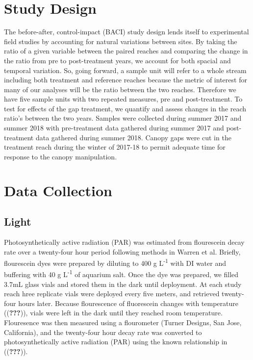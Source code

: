 \documentclass[double,12pt]{beavtex}
\begin{document}
  \section*{Study Design}\label{study-design}
  
  The before-after, control-impact (BACI) study design lends itself to
  experimental field studies by accounting for natural variations between
  sites. By taking the ratio of a given variable between the paired
  reaches and comparing the change in the ratio from pre to post-treatment
  years, we account for both spacial and temporal variation. So, going
  forward, a sample unit will refer to a whole stream including both
  treatment and reference reaches because the metric of interest for many
  of our analyses will be the ratio between the two reaches. Therefore we
  have five sample units with two repeated measures, pre and
  post-treatment. To test for effects of the gap treatment, we quantify
  and assess changes in the reach ratio's between the two years. Samples
  were collected during summer 2017 and summer 2018 with pre-treatment
  data gathered during summer 2017 and post-treatment data gathered during
  summer 2018. Canopy gaps were cut in the treatment reach during the
  winter of 2017-18 to permit adequate time for response to the canopy
  manipulation.
  
  \section*{Data Collection}\label{data-collection}
  
  \subsection*{Light}\label{light}
  
  Photosynthetically active radiation (PAR) was estimated from flourescein
  decay rate over a twenty-four hour period following methods in Warren et
  al. Briefly, flourescein dyes were prepared by diluting to 400 g
  L\textsuperscript{-1} with DI water and buffering with 40 g
  L\textsuperscript{-1} of aquarium salt. Once the dye was prepared, we
  filled 3.7mL glass vials and stored them in the dark until deployment.
  At each study reach hree replicate vials were deployed every five
  meters, and retrieved twenty-four hours later. Because flourescence of
  fluorescein changes with temperature (({\textbf{???}})), vials were left
  in the dark until they reached room temperature. Flouresence was then
  measured using a flourometer (Turner Designs, San Jose, California), and
  the twenty-four hour decay rate was converted to photosynthetically
  active radiation (PAR) using the known relationship in
  (({\textbf{???}})).
  
\end{document}
